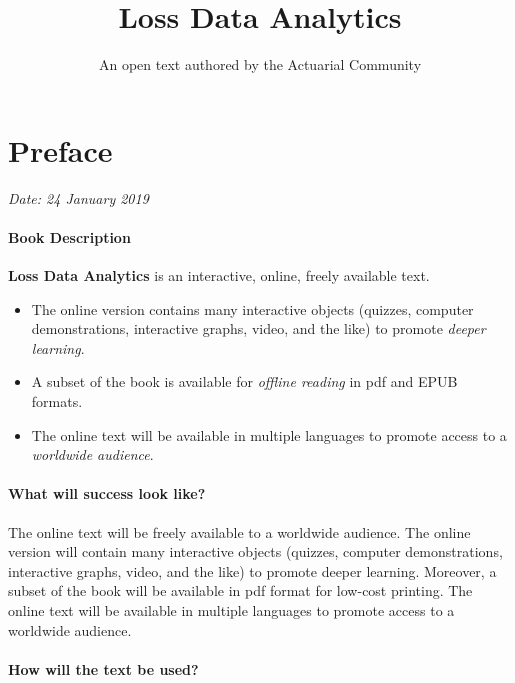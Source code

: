 \documentclass[]{book}
\title{Loss Data Analytics}
\author{An open text authored by the Actuarial Community}
\date{}
\providecommand{\tightlist}{%
  \setlength{\itemsep}{0pt}\setlength{\parskip}{0pt}}
\theoremstyle{definition}
\theoremstyle{definition}
\theoremstyle{definition}
\theoremstyle{remark}
\begin{document}
\maketitle

{
\setcounter{tocdepth}{2}
\tableofcontents
}
\chapter*{Preface}\label{preface}

\emph{Date: 24 January 2019}

\subsubsection*{Book Description}\label{book-description}

\textbf{Loss Data Analytics} is an interactive, online, freely available
text.

\begin{itemize}
\tightlist
\item
  The online version contains many interactive objects (quizzes,
  computer demonstrations, interactive graphs, video, and the like) to
  promote \emph{deeper learning}.
\item
  A subset of the book is available for \emph{offline reading} in pdf
  and EPUB formats.
\item
  The online text will be available in multiple languages to promote
  access to a \emph{worldwide audience}.
\end{itemize}

\subsubsection*{What will success look
like?}\label{what-will-success-look-like}

The online text will be freely available to a worldwide audience. The
online version will contain many interactive objects (quizzes, computer
demonstrations, interactive graphs, video, and the like) to promote
deeper learning. Moreover, a subset of the book will be available in pdf
format for low-cost printing. The online text will be available in
multiple languages to promote access to a worldwide audience.

\subsubsection*{How will the text be
used?}\label{how-will-the-text-be-used}
\end{document}
